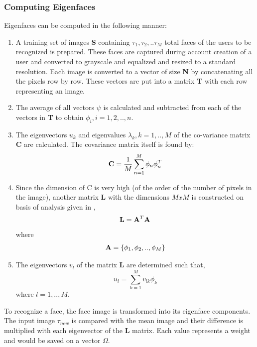 \documentclass[12pt]{article}			%
\begin{document}
\subsubsection{ Computing Eigenfaces }
Eigenfaces can be computed in the following manner:
\begin{enumerate}
	\item A training set of images {\bf S} containing $\tau_{1},\tau_{2},..\tau_{M}$ total faces of the users to be recognized is prepared. These faces are captured during account creation of a user and converted to grayscale and equalized and resized to a standard resolution. Each image is converted to a vector of size {\bf N} by concatenating all the pixels row by row. These vectors are put into a matrix {\bf T} with each row representing an image.
	\item The average of all vectors $\psi$ is calculated and subtracted from each of the vectors in {\bf T} to obtain $\phi_{i}, i = 1,2,..,n$.
	\item The eigenvectors $u_{k}$ and eigenvalues $\lambda_{k}, k = 1,..,M$ of the co-variance matrix {\bf C} are calculated. The covariance matrix itself is found by: 
\begin{equation}
{\bf C} = \frac{1}{M}\sum_{n=1}^{M}\phi_{n}\phi_{n}^{T}
\end{equation}
	\item Since the dimension of C is very high (of the order of the number of pixels in the image), another matrix {\bf L} with the dimensions $MxM$ is constructed on basis of analysis given in \cite{Turk91}, 
	\begin{equation}
	{\bf L} = {\bf A}^{T}{\bf A}
	\end{equation}
	where 
	\begin{equation}
	{\bf A} = \{\phi_{1},\phi_{2},..,\phi_{M}\}
	\end{equation}
	\item The eigenvectors $v_{l}$ of the matrix {\bf L} are determined such that,
	\begin{equation}
	u_{l} = \sum_{k=1}^{M}v_{lk}\phi_{k} 
	\end{equation}
where $l = 1,..,M$.
\end{enumerate}

To recognize a face, the face image is transformed into its eigenface components. The input image $\tau_{new}$ is compared with the mean image and their difference is multiplied with each eigenvector of the {\bf L} matrix. Each value represents a weight and would be saved on a vector $\Omega$.
\end{document}
